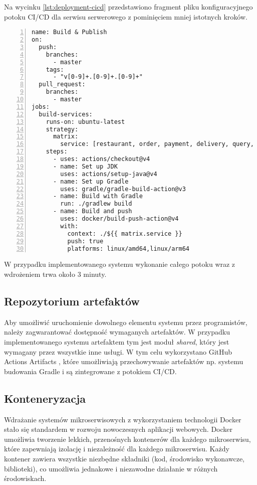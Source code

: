 Na wycinku \ref{lst:deployment-cicd} przedstawiono fragment pliku konfiguracyjnego potoku CI/CD dla serwisu serwerowego z pominięciem mniej istotnych kroków.

\begin{lstlisting}[caption={Fragment potoku CI/CD},label={lst:deployment-cicd},captionpos=b,numbers=left]
name: Build & Publish
on:
  push:
    branches:
      - master
    tags:
      - "v[0-9]+.[0-9]+.[0-9]+"
  pull_request:
    branches:
      - master
jobs:
  build-services:
    runs-on: ubuntu-latest
    strategy:
      matrix:
        service: [restaurant, order, payment, delivery, query, saga]
    steps:
      - uses: actions/checkout@v4
      - name: Set up JDK
        uses: actions/setup-java@v4
      - name: Set up Gradle
        uses: gradle/gradle-build-action@v3
      - name: Build with Gradle
        run: ./gradlew build
      - name: Build and push
        uses: docker/build-push-action@v4
        with:
          context: ./${{ matrix.service }}
          push: true
          platforms: linux/amd64,linux/arm64
\end{lstlisting}

W przypadku implementowanego systemu wykonanie całego potoku wraz z wdrożeniem trwa około 3 minuty.

\subsection{Repozytorium artefaktów}

Aby umożliwić uruchomienie dowolnego elementu systemu przez programistów, należy zagwarantować dostępność wymaganych artefaktów. W przypadku implementowanego systemu artefaktem tym jest moduł \textit{shared}, który jest wymagany przez wszystkie inne usługi. W tym celu wykorzystano GitHub Actions Artifacts \cite{gaa}, które umożliwiają przechowywanie artefaktów np. systemu budowania Gradle i są zintegrowane z potokiem CI/CD.

\subsection{Konteneryzacja}

Wdrażanie systemów mikroserwisowych z wykorzystaniem technologii Docker stało się standardem w rozwoju nowoczesnych aplikacji webowych. Docker umożliwia tworzenie lekkich, przenośnych kontenerów dla każdego mikroserwisu, które zapewniają izolację i niezależność dla każdego mikroserwisu. Każdy kontener zawiera wszystkie niezbędne składniki (kod, środowisko wykonawcze, biblioteki), co umożliwia  jednakowe i niezawodne działanie w różnych środowiskach. 

